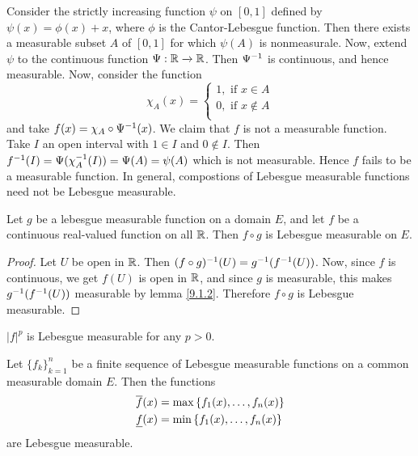 \begin{example}\label{example_9.1}
    Consider the strictly increasing function $\psi$ on  $[0,1]$ defined by
    $\psi(x)=\phi(x)+x$, where $\phi$ is the Cantor-Lebesgue function. Then
    there exists a measurable subset $A$ of $[0,1]$ for which $\psi(A)$ is
    nonmeasurale. Now, extend $\psi$ to the continuous function  $\Psi:\mathbb{R}
    \xrightarrow{} \mathbb{R}$. Then $\Psi^{-1}$ is continuous, and hence measurable.
    Now, consider the function
    \begin{equation*}
        \chi_A(x)=  \begin{cases}
                     1, \text{ if } x \in A \\
                     0, \text{ if } x \notin A \\
                 \end{cases}
    \end{equation*}
    and take $f(x)=\chi_A \circ \Psi^{-1}(x)$. We claim that $f$ is not a
    measurable function. Take  $I$ an open interval with  $1 \in I$ and  $0
    \notin I$. Then $f^{-1}(I)=\Psi(\chi_A^{-1}(I))=\Psi(A)=\psi(A)$ which is
    not measurable. Hence $f$ fails to be a measurable function. In general,
    compostions of Lebesgue measurable functions need not be Lebesgue measurable.
\end{example}

\begin{theorem}\label{9.1.6}
    Let $g$ be a lebesgue measurable function on a domain  $E$, and let  $f$ be a
    continuous real-valued function on all  $\mathbb{R}$. Then  $f \circ g$ is Lebesgue
    measurable on  $E$.
\end{theorem}
\begin{proof}
    Let $U$ be open in  $\mathbb{R}$. Then  $(f \circ g)^{-1}(U)=g^{-1}(f^{-1}(U))$.
    Now, since $f$ is continuous, we get  $f(U)$ is open in $\mathbb{R}$, and since  $g$
    is measurable, this makes  $g^{-1}(f^{-1}(U))$ measurable by lemma
    \ref{9.1.2}. Therefore $f \circ g$ is Lebesgue measurable.
\end{proof}
\begin{corollary}
    $|f|^p$ is Lebesgue measurable for any  $p>0$.
\end{corollary}

\begin{lemma}\label{9.1.7}
    Let $\{f_k\}_{k=1}^n$ be a finite sequence of Lebesgue measurable functions
    on a common measurable domain $E$. Then the functions
    \begin{align*}
        \overline{f}(x)  &=  \max{\{f_1(x), \dots, f_n(x)\}} \\
        \underline{f}(x)  &=  \min{\{f_1(x), \dots, f_n(x)\}} \\
    \end{align*}
    are Lebesgue measurable.
\end{lemma}
